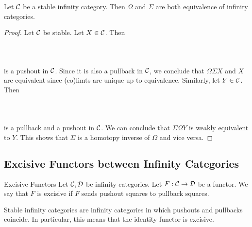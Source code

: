 \documentclass[a4paper]{article}
\begin{document}
\begin{prp}{}{} Let $\mathcal{C}$ be a stable infinity category. Then $\Omega$ and $\Sigma$ are both equivalence of infinity categories. 
\begin{proof}
Let $\mathcal{C}$ be stable. Let $X\in\mathcal{C}$. Then \\~\\
\\~\\
is a pushout in $\mathcal{C}$. Since it is also a pullback in $\mathcal{C}$, we conclude that $\Omega\Sigma X$ and $X$ are equivalent since (co)limts are unique up to equivalence. Similarly, let $Y\in\mathcal{C}$. Then \\~\\
\\~\\
is a pullback and a pushout in $\mathcal{C}$. We can conclude that $\Sigma\Omega Y$ is weakly equivalent to $Y$. This shows that $\Sigma$ is a homotopy inverse of $\Omega$ and vice versa. 
\end{proof}
\end{prp}

\subsection{Excisive Functors between Infinity Categories}
\begin{defn}{Excisive Functors}{} Let $\mathcal{C},\mathcal{D}$ be infinity categories. Let $F:\mathcal{C}\to\mathcal{D}$ be a functor. We say that $F$ is excisive if $F$ sends pushout squares to pullback squares. 
\end{defn}

Stable infinity categories are infinity categories in which pushouts and pullbacks coincide. In particular, this means that the identity functor is excisive. 
\end{document}
